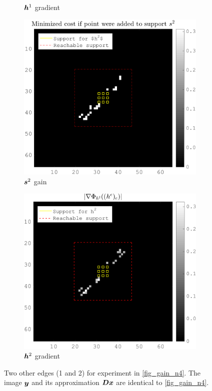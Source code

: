 \begin{figure}[!ht]
\begin{subfigure}[b]{0.24\textwidth}
	\caption{$\bm{h}^1$ gradient}
	\end{subfigure}
	\begin{subfigure}[b]{0.24\textwidth}\centering
	\includegraphics[width=\textwidth]{figures/xp/n2/xp_128x128_sc2_angl1_K3_S3_node2_objmatrix_bestvalues.png}
	\caption{$\bm{s}^2$ gain}
	\end{subfigure}
	\begin{subfigure}[b]{0.24\textwidth}\centering
	\includegraphics[width=\textwidth]{figures/xp/n2/xp_128x128_sc2_angl1_K3_S3_node2_partgrad2_bestvalues.png}
	\caption{$\bm{h}^2$ gradient}
	\end{subfigure}
\caption{Two other edges (1 and 2) for experiment in \cref{fig_gain_n4}. The image $\bm{y}$ and its approximation $\bm{D}\bm{x}$ are identical to \cref{fig_gain_n4}.}\label{fig_gain_n1_n2}
\end{figure}


